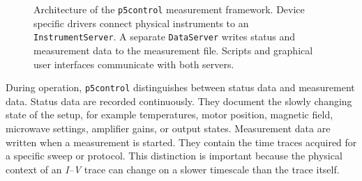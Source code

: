             \begin{figure}[t]
                \centering
                \caption{Architecture of the \texttt{p5control} measurement framework. Device specific drivers connect physical instruments to an \texttt{InstrumentServer}. A separate \texttt{DataServer} writes status and measurement data to the measurement file. Scripts and graphical user interfaces communicate with both servers.}
                \label{fig:methods:digital:p5control}
            \end{figure}

            During operation, \texttt{p5control} distinguishes between status data and measurement data. Status data are recorded continuously. They document the slowly changing state of the setup, for example temperatures, motor position, magnetic field, microwave settings, amplifier gains, or output states. Measurement data are written when a measurement is started. They contain the time traces acquired for a specific sweep or protocol. This distinction is important because the physical context of an \textit{I--V} trace can change on a slower timescale than the trace itself.

